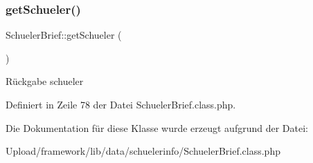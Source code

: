 \subsubsection{\texorpdfstring{get\+Schueler()}{getSchueler()}}
{\footnotesize\ttfamily Schueler\+Brief\+::get\+Schueler (\begin{DoxyParamCaption}{ }\end{DoxyParamCaption})}

\begin{DoxyReturn}{Rückgabe}
schueler 
\end{DoxyReturn}


Definiert in Zeile 78 der Datei Schueler\+Brief.\+class.\+php.



Die Dokumentation für diese Klasse wurde erzeugt aufgrund der Datei\+:\begin{DoxyCompactItemize}
\item 
Upload/framework/lib/data/schuelerinfo/Schueler\+Brief.\+class.\+php\end{DoxyCompactItemize}
